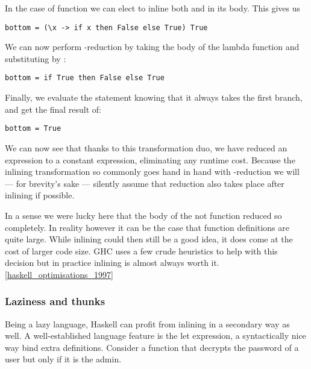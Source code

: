 In the case of  function we can elect to inline both  and 
in its body. This gives us 

\begin{listing}[H]
\begin{verbatim}
bottom = (\x -> if x then False else True) True
\end{verbatim}
\end{listing}

We can now perform \textbeta-reduction by taking the body of the lambda function
and substituting  by :

\begin{listing}[H]
\begin{verbatim}
bottom = if True then False else True
\end{verbatim}
\end{listing}

Finally, we evaluate the  statement knowing that it always takes the first branch, and
get the final result of:

\begin{listing}[H]
\begin{verbatim}
bottom = True
\end{verbatim}
\end{listing}

We can now see that thanks to this transformation duo, we have reduced an expression to a constant
expression, eliminating any runtime cost. Because the inlining transformation so commonly goes hand
in hand with \textbeta-reduction we will --- for brevity's sake --- silently assume that reduction also takes
place after inlining if possible.

In a sense we were lucky here that the body of the not function reduced so completely. In reality however
it can be the case that function definitions are quite large. While inlining could then still be a good idea,
it does come at the cost of larger code size. GHC uses a few crude heuristics to help with this decision but
in practice inlining is almost always worth it. \ref{haskell_optimisations_1997}


\subsubsection{Laziness and thunks}
Being a lazy language, Haskell can profit from inlining in a secondary way as well. A well-established
language feature is the let expression, a syntactically nice way bind extra definitions. Consider a function
that decrypts the password of a user but only if it is the admin.

